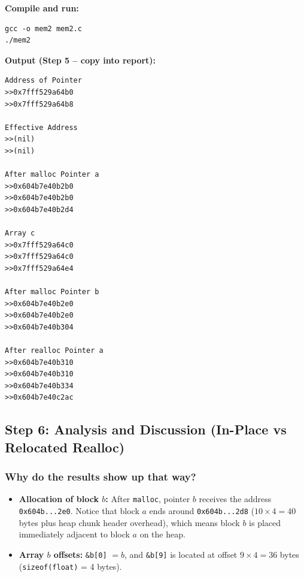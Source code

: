 \documentclass[12pt,a4paper]{article}
\begin{document}
\textbf{Compile and run:}
\begin{lstlisting}[style=bashstyle]
gcc -o mem2 mem2.c
./mem2
\end{lstlisting}

\textbf{Output (Step 5 -- copy into report):}
\begin{lstlisting}[style=outstyle]
Address of Pointer
>>0x7fff529a64b0
>>0x7fff529a64b8

Effective Address
>>(nil)
>>(nil)

After malloc Pointer a
>>0x604b7e40b2b0
>>0x604b7e40b2b0
>>0x604b7e40b2d4

Array c
>>0x7fff529a64c0
>>0x7fff529a64c0
>>0x7fff529a64e4

After malloc Pointer b
>>0x604b7e40b2e0
>>0x604b7e40b2e0
>>0x604b7e40b304

After realloc Pointer a
>>0x604b7e40b310
>>0x604b7e40b310
>>0x604b7e40b334
>>0x604b7e40c2ac
\end{lstlisting}

\subsection{Step 6: Analysis and Discussion (In-Place vs Relocated Realloc)}

\subsubsection*{Why do the results show up that way?}
\begin{itemize}
    \item \textbf{Allocation of block $b$:} After \texttt{malloc}, pointer $b$ receives the address \texttt{0x604b...2e0}. Notice that block $a$ ends around \texttt{0x604b...2d8} ($10 \times 4 = 40$ bytes plus heap chunk header overhead), which means block $b$ is placed immediately adjacent to block $a$ on the heap.
    \item \textbf{Array $b$ offsets:} \verb|&b[0]| $= b$, and \verb|&b[9]| is located at offset $9 \times 4 = 36$ bytes (\texttt{sizeof(float)} = 4 bytes).
\end{itemize}
\end{document}
